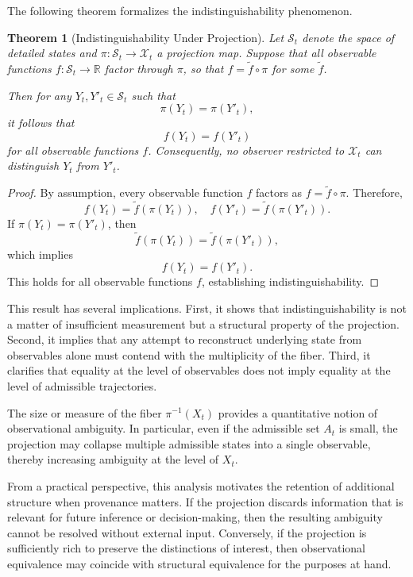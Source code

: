 \documentclass[11pt,oneside]{article}
\newtheorem{theorem}[definition]{Theorem}
\begin{document}
The following theorem formalizes the indistinguishability phenomenon.

\begin{theorem}[Indistinguishability Under Projection]
Let \( \mathcal{S}_t \) denote the space of detailed states and \( \pi : \mathcal{S}_t \to \mathcal{X}_t \) a projection map. Suppose that all observable functions \( f : \mathcal{S}_t \to \mathbb{R} \) factor through \( \pi \), so that \( f = \tilde{f} \circ \pi \) for some \( \tilde{f} \).

Then for any \( Y_t, Y'_t \in \mathcal{S}_t \) such that
\[
\pi(Y_t) = \pi(Y'_t),
\]
it follows that
\[
f(Y_t) = f(Y'_t)
\]
for all observable functions \( f \). Consequently, no observer restricted to \( \mathcal{X}_t \) can distinguish \( Y_t \) from \( Y'_t \).
\end{theorem}

\begin{proof}
By assumption, every observable function \( f \) factors as \( f = \tilde{f} \circ \pi \). Therefore,
\[
f(Y_t) = \tilde{f}(\pi(Y_t)), \quad f(Y'_t) = \tilde{f}(\pi(Y'_t)).
\]
If \( \pi(Y_t) = \pi(Y'_t) \), then
\[
\tilde{f}(\pi(Y_t)) = \tilde{f}(\pi(Y'_t)),
\]
which implies
\[
f(Y_t) = f(Y'_t).
\]
This holds for all observable functions \( f \), establishing indistinguishability.
\end{proof}

This result has several implications. First, it shows that indistinguishability is not a matter of insufficient measurement but a structural property of the projection. Second, it implies that any attempt to reconstruct underlying state from observables alone must contend with the multiplicity of the fiber. Third, it clarifies that equality at the level of observables does not imply equality at the level of admissible trajectories.

The size or measure of the fiber \( \pi^{-1}(X_t) \) provides a quantitative notion of observational ambiguity. In particular, even if the admissible set \( A_t \) is small, the projection may collapse multiple admissible states into a single observable, thereby increasing ambiguity at the level of \( X_t \).

From a practical perspective, this analysis motivates the retention of additional structure when provenance matters. If the projection discards information that is relevant for future inference or decision-making, then the resulting ambiguity cannot be resolved without external input. Conversely, if the projection is sufficiently rich to preserve the distinctions of interest, then observational equivalence may coincide with structural equivalence for the purposes at hand.
\end{document}
